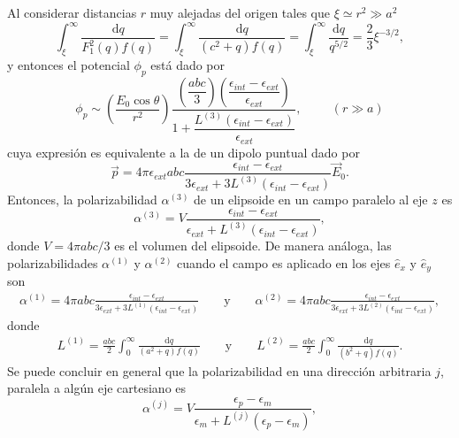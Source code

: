 Al considerar distancias $r$ muy alejadas del origen tales que $\xi\simeq r^2\gg a^2$
\begin{equation*}
    \int_{\xi}^{\infty}\frac{\text{d}q}{F_1^2(q)f(q)}= \int_{\xi}^{\infty}\frac{\text{d}q}{(c^2+q)f(q)}=\int_{\xi}^{\infty}\frac{\text{d}q}{q^{5/2}}=\frac{2}{3}\xi^{-3/2},
\end{equation*}
y entonces el potencial $\phi_p$ está dado por
\begin{equation}
    \phi_p\sim\left(\dfrac{E_0\cos\theta}{r^2}\right)\dfrac{\left(\dfrac{abc}{3}\right)\left(\dfrac{\epsilon_{int}-\epsilon_{ext}}{\epsilon_{ext}}\right)}{1+\dfrac{L^{(3)}(\epsilon_{int}-\epsilon_{ext})}{\epsilon_{ext}}},\hspace{1cm}(r\gg a)
\end{equation}
cuya expresión es equivalente a la de un dipolo puntual dado por
\begin{equation}
    \Vec{p}=4\pi\epsilon_{ext} abc\frac{\epsilon_{int}-\epsilon_{ext}}{3\epsilon_{ext}+3L^{(3)}(\epsilon_{int}-\epsilon_{ext})}\Vec{E}_0
    \label{momento_dip}.
\end{equation}
Entonces, la polarizabilidad $\alpha^{(3)}$ de un elipsoide en un campo paralelo al eje $z$ es
\begin{equation}
    \alpha^{(3)}=V\frac{\epsilon_{int}-\epsilon_{ext}}{\epsilon_{ext}+L^{(3)}(\epsilon_{int}-\epsilon_{ext})},
\end{equation}
donde $V=4\pi abc/3$ es el volumen del elipsoide. De manera análoga, las polarizabilidades $ \alpha^{(1)}$ y $ \alpha^{(2)}$ cuando el campo es aplicado en los ejes $\hat{e}_x$ y $\hat{e}_y$ son
\begin{align*}
    \alpha^{(1)}=4\pi abc \frac{\epsilon_{int}-\epsilon_{ext}}{3\epsilon_{ext}+3L^{(1)}(\epsilon_{int}-\epsilon_{ext})}\qquad\text{y}\qquad
    \alpha^{(2)}=4\pi abc \frac{\epsilon_{int}-\epsilon_{ext}}{3\epsilon_{ext}+3L^{(2)}(\epsilon_{int}-\epsilon_{ext})},
\end{align*}
donde 
\begin{align*}
    L^{(1)}=\frac{abc}{2}\int_{0}^{\infty}\frac{\text{d}q}{(a^2+q)f(q)}\qquad\text{y}\qquad
    L^{(2)}=\frac{abc}{2}\int_{0}^{\infty}\frac{\text{d}q}{(b^2+q)f(q)}.
\end{align*}
Se puede concluir en general que la polarizabilidad en una dirección arbitraria $j$, paralela a algún eje cartesiano es
\begin{equation}
    \alpha^{(j)}=V\frac{\epsilon_p-\epsilon_m}{\epsilon_m+L^{(j)}(\epsilon_p-\epsilon_m)},
\end{equation}
